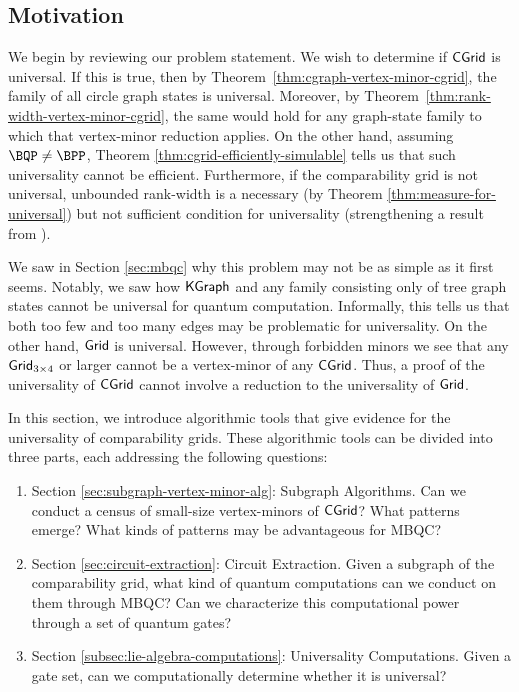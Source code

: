 \subsection{Motivation}

We begin by reviewing our problem statement. We wish to determine if $\mathsf{CGrid}$ is universal. If this is true, then by Theorem~\ref{thm:cgraph-vertex-minor-cgrid}, the
family of all circle graph states is universal. Moreover, by
Theorem~\ref{thm:rank-width-vertex-minor-cgrid}, the same would hold for any
graph-state family to which that vertex-minor reduction applies. On the other hand, assuming $\BQP \neq \BPP$, Theorem \ref{thm:cgrid-efficiently-simulable} tells us that such universality cannot be efficient. Furthermore, if the comparability grid is not universal, unbounded rank-width is a necessary (by Theorem \ref{thm:measure-for-universal}) but not sufficient condition for universality (strengthening a result from \cite{circle-graphs}).

We saw in Section \ref{sec:mbqc} why this problem may not be as simple as it first seems. Notably, we saw how $\mathsf{KGraph}$ and any family consisting only of tree graph states cannot be universal for quantum computation. Informally, this tells us that both too few and too many edges may be problematic for universality. On the other hand, $\mathsf{Grid}$ is universal. However, through forbidden minors we see that any $\mathsf{Grid}_{3 \times 4}$ or larger cannot be a vertex-minor of any $\mathsf{CGrid}$. Thus, a proof of the universality of $\mathsf{CGrid}$ cannot involve a reduction to the universality of $\mathsf{Grid}$.

In this section, we introduce algorithmic tools that give evidence for the universality of comparability grids. These algorithmic tools can be divided into three parts, each addressing the following questions:
\begin{enumerate}
    \item Section \ref{sec:subgraph-vertex-minor-alg}: Subgraph Algorithms. Can we conduct a census of small-size vertex-minors of $\mathsf{CGrid}$? What patterns emerge? What kinds of patterns may be advantageous for MBQC?
    \item Section \ref{sec:circuit-extraction}: Circuit Extraction. Given a subgraph of the comparability grid, what kind of quantum computations can we conduct on them through MBQC? Can we characterize this computational power through a set of quantum gates?
    \item Section \ref{subsec:lie-algebra-computations}: Universality Computations. Given a gate set, can we computationally determine whether it is universal? 
\end{enumerate}